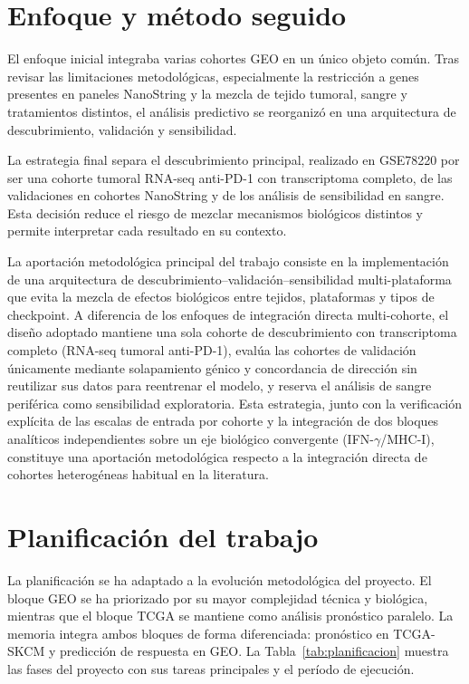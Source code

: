 \section{Enfoque y método seguido}

El enfoque inicial integraba varias cohortes GEO en un único objeto común. Tras revisar las limitaciones metodológicas, especialmente la restricción a genes presentes en paneles NanoString y la mezcla de tejido tumoral, sangre y tratamientos distintos, el análisis predictivo se reorganizó en una arquitectura de descubrimiento, validación y sensibilidad.

La estrategia final separa el descubrimiento principal, realizado en GSE78220 por ser una cohorte tumoral RNA-seq anti-PD-1 con transcriptoma completo, de las validaciones en cohortes NanoString y de los análisis de sensibilidad en sangre. Esta decisión reduce el riesgo de mezclar mecanismos biológicos distintos y permite interpretar cada resultado en su contexto.

La aportación metodológica principal del trabajo consiste en la implementación de una arquitectura de descubrimiento--validación--sensibilidad multi-plataforma que evita la mezcla de efectos biológicos entre tejidos, plataformas y tipos de checkpoint. A diferencia de los enfoques de integración directa multi-cohorte, el diseño adoptado mantiene una sola cohorte de descubrimiento con transcriptoma completo (RNA-seq tumoral anti-PD-1), evalúa las cohortes de validación únicamente mediante solapamiento génico y concordancia de dirección sin reutilizar sus datos para reentrenar el modelo, y reserva el análisis de sangre periférica como sensibilidad exploratoria. Esta estrategia, junto con la verificación explícita de las escalas de entrada por cohorte y la integración de dos bloques analíticos independientes sobre un eje biológico convergente (IFN-$\gamma$/MHC-I), constituye una aportación metodológica respecto a la integración directa de cohortes heterogéneas habitual en la literatura.

\section{Planificación del trabajo}

La planificación se ha adaptado a la evolución metodológica del proyecto. El bloque GEO se ha priorizado por su mayor complejidad técnica y biológica, mientras que el bloque TCGA se mantiene como análisis pronóstico paralelo. La memoria integra ambos bloques de forma diferenciada: pronóstico en TCGA-SKCM y predicción de respuesta en GEO. La Tabla~\ref{tab:planificacion} muestra las fases del proyecto con sus tareas principales y el período de ejecución.

